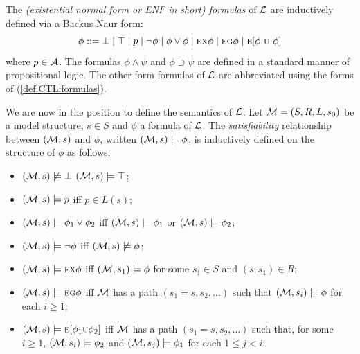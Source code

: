 \documentclass{article}
\begin{document}
The {\em (existential normal form or ENF in short) formulas} of
$\cal L$ are inductively defined via a Backus Naur form:
\begin{equation}\label{def:CTL:formulas}
  \phi ::=  \bot \mid \top \mid p \mid\neg\phi \mid \phi\lor\phi \mid
    \EXIST \NEXT \phi \mid
    \EXIST \GLOBAL \phi \mid
    \EXIST [\phi\ \UNTIL\ \phi]%
\end{equation}
where $p\in\cal A$. The formulas $\phi\land\psi$ and $\phi\supset \psi$
are defined in a standard manner of propositional logic.
The other form formulas of $\cal L$ are abbreviated
using the forms of (\ref{def:CTL:formulas}).

We are now in the position to define the semantics of $\cal L$.
Let ${\cal M}=(S,R,L,s_0)$ be a model structure, $s\in S$ and $\phi$ a formula of $\cal L$.
The {\em satisfiability} relationship between $({\cal M},s)$ and $\phi$,
written $({\cal M},s)\models\phi$, is inductively defined on the structure of $\phi$ as follows:

\begin{itemize}
  \item $({\cal M},s)\not\models\bot$   $({\cal M},s)\models\top$;
  \item $({\cal M},s)\models p$ iff $p\in L(s)$;
  \item $({\cal M},s)\models \phi_1\lor\phi_2$ iff
    $({\cal M},s)\models \phi_1$ or $({\cal M},s)\models \phi_2$;
  \item $({\cal M},s)\models \neg\phi$ iff  $({\cal M},s)\not\models\phi$;
  \item $({\cal M},s)\models \textsc{e}\textsc{x}\phi$ iff
    $({\cal M},s_1)\models\phi$ for some $s_1\in S$ and $(s,s_1)\in R$;
  \item $({\cal M},s)\models \textsc{e}\textsc{g}\phi$ iff
    $\cal M$ has a path $(s_1=s,s_2,\ldots)$ such that
    $({\cal M},s_i)\models\phi$ for each $i\ge 1$;
  \item $({\cal M},s)\models \textsc{e}[\phi_1\textsc{u}\phi_2]$ iff
    $\cal M$ has a path $(s_1=s,s_2,\ldots)$ such that, for some $i\ge 1$,
    $({\cal M},s_i)\models\phi_2$ and
    $({\cal M},s_j)\models\phi_1$ for each $1\leq j<i$.
\end{itemize}
\end{document}
